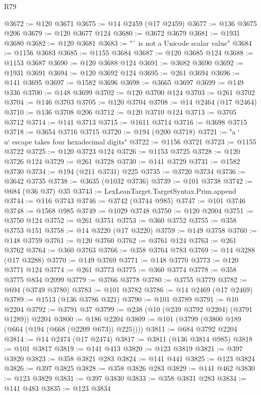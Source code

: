 \begin{lexlean}{R79}
\begin{coremodule}
@3672 := @120 @3671
@3675 := @14 @2459 (@17 @2459)
@3677 := @136 @3675 @206
@3679 := @120 @3677 @124
@3680 := @3672 @3679
@3681 := @1931 @3680
@3682 := @120 @3681
@3683 := "` is not a Unicode scalar value"
@3684 := @1156 @3683
@3685 := @1155 @3684
@3687 := @120 @3685 @124
@3688 := @1153 @3687
@3690 := @120 @3688 @124
@3691 := @3682 @3690
@3692 := @1931 @3691
@3694 := @120 @3692 @124
@3695 := @261 @3694
@3696 := @141 @3695
@3697 := @1582 @3696
@3698 := @3665 @3697
@3699 := @149 @336
@3700 := @148 @3699
@3702 := @120 @3700 @124
@3703 := @261 @3702
@3704 := @146 @3703
@3705 := @120 @3704
@3708 := @14 @2464 (@17 @2464)
@3710 := @136 @3708 @206
@3712 := @120 @3710 @124
@3713 := @3705 @3712
@3714 := @141 @3713
@3715 := @1611 @3714
@3716 := @3698 @3715
@3718 := @3654 @3716 @3715
@3720 := @194 (@200 @3718)
@3721 := "a `\\u` escape takes four hexadecimal digits"
@3722 := @1156 @3721
@3723 := @1155 @3722
@3725 := @120 @3723 @124
@3726 := @1153 @3725
@3728 := @120 @3726 @124
@3729 := @261 @3728
@3730 := @141 @3729
@3731 := @1582 @3730
@3734 := @194 (@211 @3731) @225
@3735 := @3720 @3734
@3736 := @3642 @3735
@3738 := @3635 (@1032 @3736)
@3739 := @101 @3738
@3742 := @684 (@36 @37) @35
@3743 := LexLeanTarget.TargetSyntax.Prim.append
@3744 := @116 @3743
@3746 := @3742 (@3744 @985)
@3747 := @101 @3746
@3748 := @1568 @985
@3749 := @1029 @3748
@3750 := @120 @2004
@3751 := @3750 @124
@3752 := @261 @3751
@3753 := @360 @3752
@3755 := @358 @3753 @151
@3758 := @14 @3220 (@17 @3220)
@3759 := @149 @3758
@3760 := @148 @3759
@3761 := @120 @3760
@3762 := @3761 @124
@3763 := @261 @3762
@3764 := @360 @3763
@3766 := @358 @3764 @783
@3769 := @14 @3288 (@17 @3288)
@3770 := @149 @3769
@3771 := @148 @3770
@3773 := @120 @3771 @124
@3774 := @261 @3773
@3775 := @360 @3774
@3778 := @358 @3775 @834 @2099
@3779 := @3766 @3778
@3780 := @3755 @3779
@3782 := @694 (@3749 @3780)
@3783 := @101 @3782
@3786 := @14 @2469 (@17 @2469)
@3789 := @1513 (@136 @3786 @321)
@3790 := @101 @3789
@3791 := @10 @2204
@3792 := @3791 @37
@3799 := @238 (@10 (@239 @3792 @2204) (@3791 @1289)) @2204
@3800 := @186 @2204
@3809 := @101 (@3799 (@3800 @189 (@664 (@194 (@668 (@2209 @673)) @225))))
@3811 := @684 @3792 @2204
@3814 := @14 @2474 (@17 @2474)
@3817 := @3811 (@136 @3814 @985)
@3818 := @101 @3817
@3819 := @141 @413
@3820 := @123 @3819
@3821 := @397 @3820
@3823 := @358 @3821 @283
@3824 := @141 @441
@3825 := @123 @3824
@3826 := @397 @3825
@3828 := @358 @3826 @283
@3829 := @141 @462
@3830 := @123 @3829
@3831 := @397 @3830
@3833 := @358 @3831 @283
@3834 := @141 @483
@3835 := @123 @3834

\end{coremodule}
\end{lexlean}
